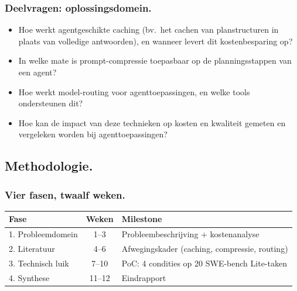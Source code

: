 \documentclass[aspectratio=169]{beamer}
\begin{document}
\begin{frame}
    \frametitle{Deelvragen: oplossingsdomein.}

    \begin{itemize}
        \item Hoe werkt agentgeschikte caching (bv.\ het cachen van
            planstructuren in plaats van volledige antwoorden), en
            wanneer levert dit kostenbesparing op?
        \item In welke mate is prompt-compressie toepasbaar op de
            planningsstappen van een agent?
        \item Hoe werkt model-routing voor agenttoepassingen, en welke
            tools ondersteunen dit?
        \item Hoe kan de impact van deze technieken op kosten en
            kwaliteit gemeten en vergeleken worden bij
            agenttoepassingen?
    \end{itemize}
\end{frame}

\subsection{Methodologie.}

\begin{frame}
    \frametitle{Vier fasen, twaalf weken.}

    \small
    \begin{table}
        \begin{tabular}{@{}lcp{5.8cm}@{}}
        \toprule
        \textbf{Fase} & \textbf{Weken} & \textbf{Milestone} \\
        \midrule
        1. Probleemdomein  & 1--3   & Probleembeschrijving + kostenanalyse \\
        2. Literatuur       & 4--6   & Afwegingskader (caching, compressie, routing) \\
        3. Technisch luik   & 7--10  & PoC: 4 condities op 20 SWE-bench Lite-taken \\
        4. Synthese         & 11--12 & Eindrapport \\
        \bottomrule
        \end{tabular}
    \end{table}
\end{frame}
\end{document}
